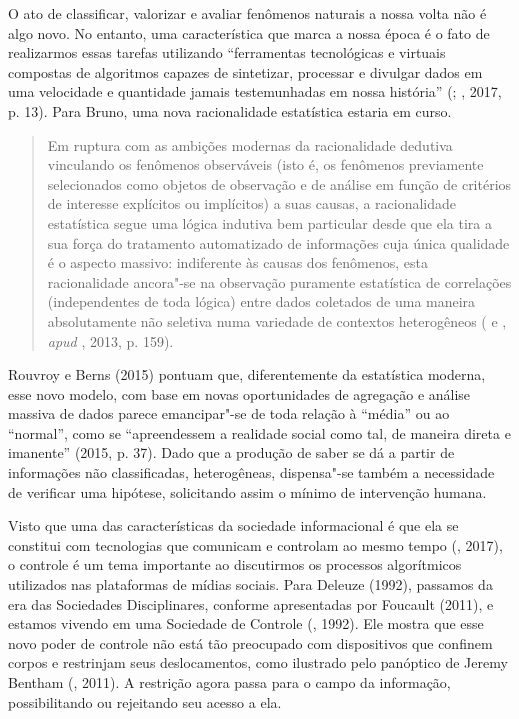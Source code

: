 O ato de classificar, valorizar e avaliar fenômenos naturais a nossa
volta não é algo novo. No entanto, uma característica que marca a nossa
época é o fato de realizarmos essas tarefas utilizando ``ferramentas
tecnológicas e virtuais compostas de algoritmos capazes de sintetizar,
processar e divulgar dados em uma velocidade e quantidade jamais
testemunhadas em nossa história'' (; , 2017, p. 13). Para Bruno, uma nova racionalidade estatística estaria em curso.

\begin{quote}
Em ruptura com as ambições modernas da racionalidade dedutiva vinculando
os fenômenos observáveis (isto é, os fenômenos previamente selecionados
como objetos de observação e de análise em função de critérios de
interesse explícitos ou implícitos) a suas causas, a racionalidade
estatística segue uma lógica indutiva bem particular desde que ela tira
a sua força do tratamento automatizado de informações cuja única
qualidade é o aspecto massivo: indiferente às causas dos fenômenos, esta
racionalidade ancora"-se na observação puramente estatística de
correlações (independentes de toda lógica) entre dados coletados de uma
maneira absolutamente não seletiva numa variedade de contextos
heterogêneos ( e , \emph{apud} , 2013, p. 159).
\end{quote}

Rouvroy e Berns (2015) pontuam que, diferentemente da estatística
moderna, esse novo modelo, com base em novas oportunidades de agregação
e análise massiva de dados parece emancipar"-se de toda relação à
``média'' ou ao ``normal'', como se ``apreendessem a realidade social
como tal, de maneira direta e imanente'' (2015, p. 37). Dado que a produção
de saber se dá a partir de informações não classificadas, heterogêneas,
dispensa"-se também a necessidade de verificar uma hipótese, solicitando
assim o mínimo de intervenção humana.

Visto que uma das características da sociedade informacional é que ela
se constitui com tecnologias que comunicam e controlam ao mesmo tempo
(, 2017), o controle é um tema importante ao discutirmos os
processos algorítmicos utilizados nas plataformas de mídias sociais.
Para Deleuze (1992), passamos da era das Sociedades Disciplinares,
conforme apresentadas por Foucault (2011), e estamos vivendo em uma Sociedade de Controle (, 1992). Ele mostra que esse novo poder de controle não está tão
preocupado com dispositivos que confinem corpos e restrinjam seus
deslocamentos, como ilustrado pelo panóptico de Jeremy Bentham (, 2011).
A restrição agora passa para o campo da informação, possibilitando ou rejeitando seu acesso a ela.

